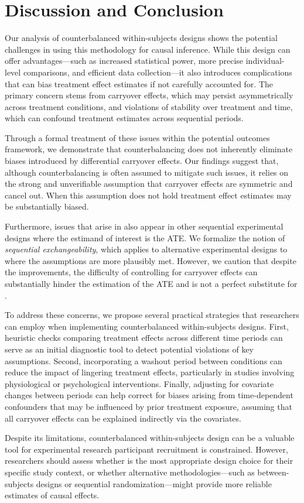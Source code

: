 \section{Discussion and Conclusion}
\label{sec: conclusion}

Our analysis of counterbalanced within-subjects designs shows the potential challenges in using this methodology for causal inference. While this design can offer advantages—such as increased statistical power, more precise individual-level comparisons, and efficient data collection—it also introduces complications that can bias treatment effect estimates if not carefully accounted for. The primary concern stems from carryover effects, which may persist asymmetrically across treatment conditions, and violations of stability over treatment and time, which can confound treatment estimates across sequential periods. 

Through a formal treatment of these issues within the potential outcomes framework, we demonstrate that counterbalancing does not inherently eliminate biases introduced by differential carryover effects. Our findings suggest that, although counterbalancing is often assumed to mitigate such issues, it relies on the strong and unverifiable assumption that carryover effects are symmetric and cancel out. When this assumption does not hold treatment effect estimates may be substantially biased.

Furthermore, issues that arise in \cwsd{} also appear in other sequential experimental designs where the estimand of interest is the ATE. We formalize the notion of \emph{sequential exchangeability}, which applies to alternative experimental designs to \cwsd{} where the assumptions are more plausibly met. However, we caution that despite the improvements, the difficulty of controlling for carryover effects can substantially hinder the estimation of the ATE and is not a perfect substitute for \bsd{}.

To address these concerns, we propose several practical strategies that researchers can employ when implementing counterbalanced within-subjects designs. First, heuristic checks comparing treatment effects across different time periods can serve as an initial diagnostic tool to detect potential violations of key assumptions. Second, incorporating a washout period between conditions can reduce the impact of lingering treatment effects, particularly in studies involving physiological or psychological interventions. Finally, adjusting for covariate changes between periods can help correct for biases arising from time-dependent confounders that may be influenced by prior treatment exposure, assuming that all carryover effects can be explained indirectly via the covariates.

Despite its limitations, counterbalanced within-subjects design can be a valuable tool for experimental research  participant recruitment is constrained. However, researchers should assess whether \cwsd{} is the most appropriate design choice for their specific study context, or whether alternative methodologies—such as between-subjects designs or sequential randomization—might provide more reliable estimates of causal effects.